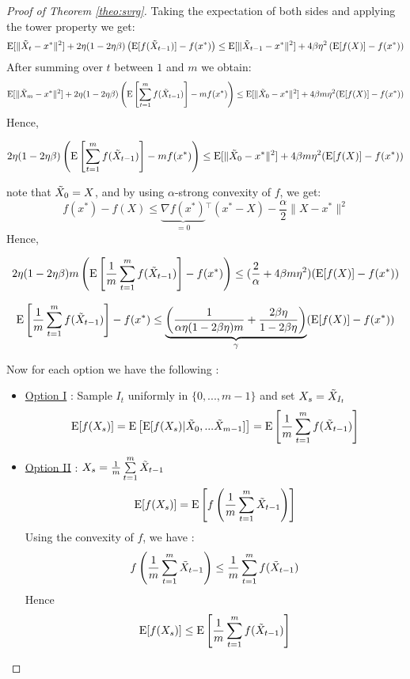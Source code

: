 \documentclass[12pt]{report}
\newcounter{theo}[section]
\newcommand{\E}{\mathrm{E}}
\begin{document}
\begin{proof}[Proof of Theorem \ref{theo:svrg}]
Taking the expectation of both sides and applying the tower property we get:
$$\E[\|\Tilde{X}_{t}-x^*\|^2]+2\eta(1-2\eta\beta)\left(\E[f(\Tilde{X}_{t-1})]-f(x^*)\right)\leq \E[\|\Tilde{X}_{t-1}-x^*\|^2] +4\beta\eta^2\left(\E[f(X)]-f(x^*)\right)$$
After summing over $t$ between $1$ and $m$ we obtain:
$$\E[\|\Tilde{X}_m-x^* \|^2]+2\eta(1-2\eta\beta)\left(\E\left[\sum\limits_{t=1}^mf(\Tilde{X}_{t-1})\right]-mf(x^*)\right) \leq \E[\|\Tilde{X}_0-x^* \|^2]+4\beta m \eta^2(\E[f(X)]-f(x^*))$$
Hence,

\begin{equation}\label{eqsvrg}
2\eta(1-2\eta\beta)\left(\E\left[\sum\limits_{t=1}^mf(\Tilde{X}_{t-1})\right]-mf(x^*)\right) \leq \E[\|\Tilde{X}_0-x^* \|^2]+4\beta m \eta^2(\E[f(X)]-f(x^*))
\end{equation}

note that $\Tilde{X}_0=X$, and by using $\alpha$-strong convexity of $f$, we get:
$$f(x^*)-f(X)\leq \underbrace{\nabla f(x^*)}_{=0}{}^ \top(x^*-X)-\frac{\alpha}{2}\|X-x^*\|^2 $$
Hence,

\begin{equation}
    2\eta(1-2\eta\beta)m\left(\E\left[\frac{1}{m}\sum\limits_{t=1}^mf(\Tilde{X}_{t-1})\right]-f(x^*)\right) \leq (\frac{2}{\alpha}+4\beta m \eta^2)(\E[f(X)]-f(x^*))
\end{equation}



\begin{equation}
   \E\left[\frac{1}{m}\sum\limits_{t=1}^mf(\Tilde{X}_{t-1})\right]-f(x^*) \leq \underbrace{\left(\frac{1}{\alpha\eta(1-2\beta\eta)m}+\frac{2\beta\eta}{1-2\beta\eta}\right)}_{\gamma}(\E[f(X)]-f(x^*))
\end{equation}


Now for each option we have the following :
\begin{itemize}

    \item \underline{Option I} : Sample $I_t$ uniformly in $\{0,...,m-1\}$  and set $X_s= \Tilde{X}_{I_t}$
    $$\E[f(X_s)]=\E\left[\E[f(X_s)|\Tilde{X}_0,...\Tilde{X}_{m-1}]\right]=\E\left[\frac{1}{m}\sum\limits_{t=1}^mf(\Tilde{X}_{t-1})\right]    $$
    \item \underline{Option II} : $X_s= \frac{1}{m}\sum\limits_{t=1}^m\Tilde{X}_{t-1}$
    $$\E[f(X_s)]=\E\left[
    f\left(\frac{1}{m}\sum\limits_{t=1}^m\Tilde{X}_{t-1}\right)\right]$$
    Using the convexity of $f$, we have :
    $$f\left(\frac{1}{m}\sum\limits_{t=1}^m\Tilde{X}_{t-1}\right)\leq \frac{1}{m}\sum\limits_{t=1}^m f(\Tilde{X}_{t-1})$$
     Hence 
    $$\E[f(X_s)]\leq \E\left[\frac{1}{m}\sum\limits_{t=1}^m f(\Tilde{X}_{t-1})\right]$$
    


\end{itemize}
\end{proof}
\end{document}
